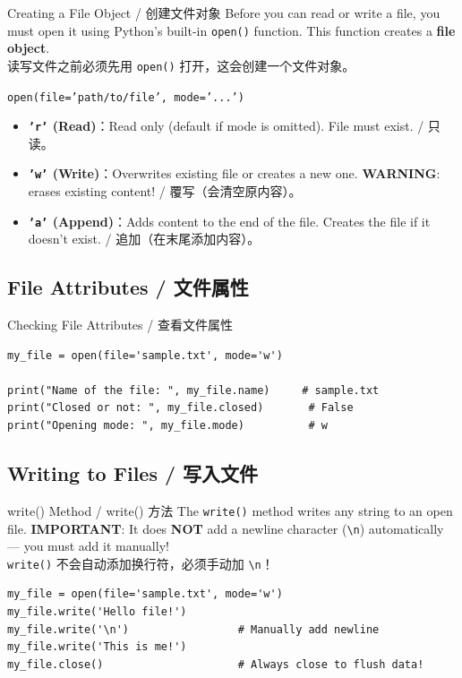 \documentclass[11pt,a4paper]{report}
\let\oldtexttt\texttt
\renewcommand{\texttt}[1]{\textcolor{mainblue}{\oldtexttt{#1}}}
\begin{document}
\begin{concept}{Creating a File Object / 创建文件对象}
    Before you can read or write a file, you must open it using Python's built-in \texttt{open()} function. This function creates a \textbf{file object}. \\
    读写文件之前必须先用 \texttt{open()} 打开，这会创建一个文件对象。

    \texttt{open(file='path/to/file', mode='...')}
    \begin{itemize}[itemsep=0.5em]
        \item \textbf{\texttt{'r'} (Read)}：Read only (default if mode is omitted). File must exist. / 只读。
        \item \textbf{\texttt{'w'} (Write)}：Overwrites existing file or creates a new one. \textbf{WARNING}: erases existing content! / 覆写（会清空原内容）。
        \item \textbf{\texttt{'a'} (Append)}：Adds content to the end of the file. Creates the file if it doesn't exist. / 追加（在末尾添加内容）。
    \end{itemize}
\end{concept}

\subsection{File Attributes / 文件属性}

\begin{examplebox}{Checking File Attributes / 查看文件属性}
\begin{lstlisting}
my_file = open(file='sample.txt', mode='w')

print("Name of the file: ", my_file.name)     # sample.txt
print("Closed or not: ", my_file.closed)       # False
print("Opening mode: ", my_file.mode)          # w
\end{lstlisting}
\end{examplebox}

\subsection{Writing to Files / 写入文件}

\begin{examplebox}{write() Method / write() 方法}
    The \texttt{write()} method writes any string to an open file. \textbf{IMPORTANT}: It does \textbf{NOT} add a newline character (\texttt{\textbackslash n}) automatically — you must add it manually! \\
    \texttt{write()} 不会自动添加换行符，必须手动加 \texttt{\textbackslash n}！
\begin{lstlisting}
my_file = open(file='sample.txt', mode='w')
my_file.write('Hello file!')
my_file.write('\n')                 # Manually add newline
my_file.write('This is me!')
my_file.close()                     # Always close to flush data!
\end{lstlisting}
\end{examplebox}
\end{document}
